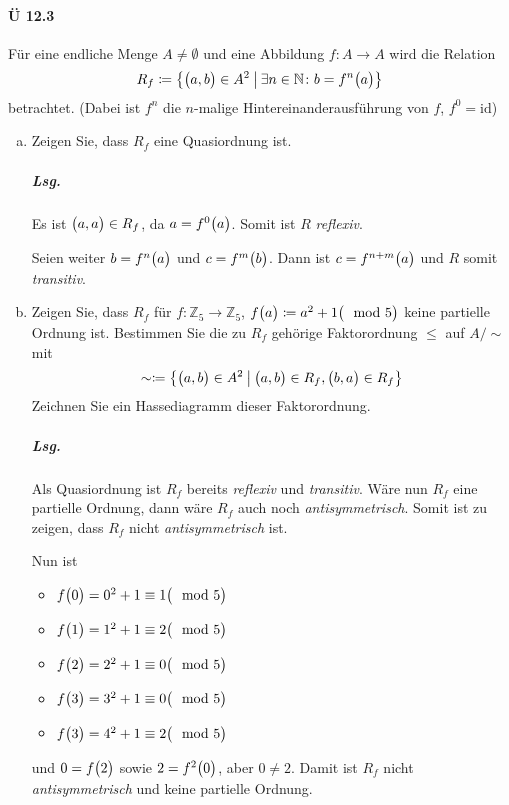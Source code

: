\documentclass{scrreprt}
\begin{document}
\paragraph{Ü 12.3} Für eine endliche Menge $A \ne \emptyset$ und eine Abbildung
$f \colon A \to A$ wird die Relation
\[
  R_f \coloneqq \qty{
    \qty\big(a, b) \in A^2
    \:\middle|\:
    \exists n \in \mathbb{N} \colon b = f^n\qty\big(a)
  }
\]
betrachtet.
(Dabei ist $f^n$ die $n$-malige Hintereinanderausführung von $f$,
$f^0 = \text{id}$)
\begin{enumerate}[(a)]
\item Zeigen Sie, dass $R_f$ eine Quasiordnung ist.

  \subparagraph{Lsg.} Es ist $\qty\big(a, a) \in R_f$, da $a = f^0\qty\big(a)$.
  Somit ist $R$ \emph{reflexiv}.

  Seien weiter $b = f^n\qty\big(a)$ und $c = f^m\qty\big(b)$.
  Dann ist $c = f^{n + m}\qty\big(a)$ und $R$ somit \emph{transitiv}.

\item Zeigen Sie, dass $R_f$ für $f \colon \mathbb{Z}_5 \to \mathbb{Z}_5$,
  $f\qty\big(a) \coloneqq a^2 + 1 \qty\big(\mod 5)$ keine partielle Ordnung ist.
  Bestimmen Sie die zu $R_f$ gehörige Faktorordnung $\leq$ auf $A / \sim$ mit
  \[
    \sim \coloneqq \qty{
      \qty\big(a, b) \in A^2
      \:\middle|\:
      \qty\big(a, b) \in R_f, \qty\big(b, a) \in R_f
    }
  \]
  Zeichnen Sie ein Hassediagramm dieser Faktorordnung.

  \subparagraph{Lsg.} Als Quasiordnung ist $R_f$ bereits \emph{reflexiv} und
  \emph{transitiv}.
  Wäre nun $R_f$ eine partielle Ordnung, dann wäre $R_f$ auch noch
  \emph{antisymmetrisch}.
  Somit ist zu zeigen, dass $R_f$ nicht \emph{antisymmetrisch} ist.

  Nun ist
  \begin{itemize}
  \item $f\qty\big(0) = 0^2 + 1 \equiv 1 \qty\big(\mod 5)$
  \item $f\qty\big(1) = 1^2 + 1 \equiv 2 \qty\big(\mod 5)$
  \item $f\qty\big(2) = 2^2 + 1 \equiv 0 \qty\big(\mod 5)$
  \item $f\qty\big(3) = 3^2 + 1 \equiv 0 \qty\big(\mod 5)$
  \item $f\qty\big(3) = 4^2 + 1 \equiv 2 \qty\big(\mod 5)$
  \end{itemize}
  und $0 = f\qty\big(2)$ sowie $2 = f^2\qty\big(0)$, aber $0 \ne 2$.
  Damit ist $R_f$ nicht \emph{antisymmetrisch} und keine partielle Ordnung.


\end{enumerate}
\end{document}
